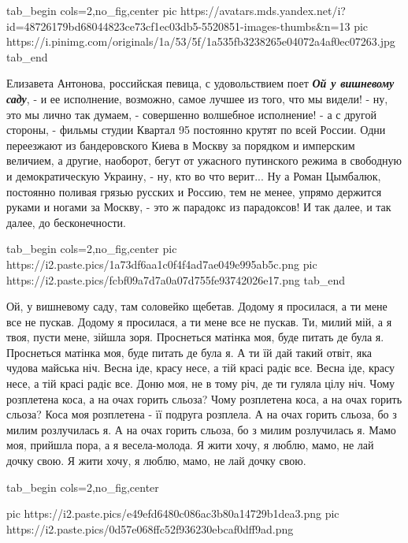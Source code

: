 \ifcmt
  tab_begin cols=2,no_fig,center
     pic https://avatars.mds.yandex.net/i?id=48726179bd68044823ce73cf1ec03db5-5520851-images-thumbs&n=13
     pic https://i.pinimg.com/originals/1a/53/5f/1a535fb3238265e04072a4af0ec07263.jpg
  tab_end
\fi

Елизавета Антонова, российская певица, с удовольствием поет \textbf{\emph{Ой у
вишневому саду}}, - и ее исполнение, возможно, самое лучшее из того, что мы
видели! - ну, это мы лично так думаем, - совершенно волшебное исполнение! - а с
другой стороны, - фильмы студии Квартал 95 постоянно крутят по всей России.
Одни переезжают из бандеровского Киева в Москву за порядком и имперским величием, а другие,
наоборот, бегут от ужасного путинского режима в свободную и демократическую
Украину, - ну, кто во что верит... Ну а Роман Цымбалюк, постоянно поливая грязью
русских и Россию, тем не менее, упрямо держится руками и ногами за Москву, -
это ж парадокс из парадоксов! И так далее, и так далее, до бесконечности.

\ifcmt
  tab_begin cols=2,no_fig,center
     pic https://i2.paste.pics/1a73df6aa1c0f4f4ad7ae049e995ab5c.png
     pic https://i2.paste.pics/fcbf09a7d7a0a07d755fe93742026e17.png
  tab_end
\fi

\raggedcolumns
\begin{multicols}{2} %
\setlength{\parindent}{0pt}
\obeycr
Ой, у вишневому саду, там соловейко щебетав.
Додому я просилася, а ти мене все не пускав.
Додому я просилася, а ти мене все не пускав.
\smallskip
Ти, милий мій, а я твоя, пусти мене, зійшла зоря.
Проснеться матінка моя, буде питать де була я.
Проснеться матінка моя, буде питать де була я.
\smallskip
А ти їй дай такий отвіт, яка чудова майська ніч.
Весна іде, красу несе, а тій красі радіє все.
Весна іде, красу несе, а тій красі радіє все.
\smallskip
Доню моя, не в тому річ, де ти гуляла цілу ніч.
Чому розплетена коса, а на очах горить сльоза?
Чому розплетена коса, а на очах горить сльоза?
\smallskip
Коса моя розплетена - її подруга розплела.
А на очах горить сльоза, бо з милим розлучилась я.
А на очах горить сльоза, бо з милим розлучилась я.
\smallskip
Мамо моя, прийшла пора, а я весела-молода.
Я жити хочу, я люблю, мамо, не лай дочку свою.
Я жити хочу, я люблю, мамо, не лай дочку свою.
\restorecr
\end{multicols} %

\ifcmt
  tab_begin cols=2,no_fig,center

     pic https://i2.paste.pics/e49efd6480c086ac3b80a14729b1dea3.png
     pic https://i2.paste.pics/0d57e068ffc52f936230ebcaf0dff9ad.png

